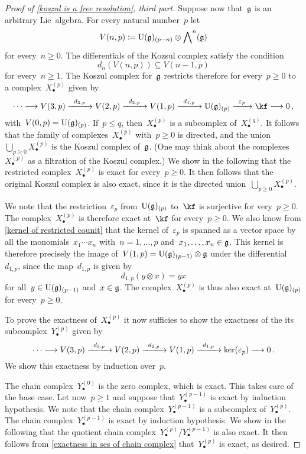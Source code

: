 \begin{proof}[Proof of \cref{koszul is a free resolution}, third part]
	Suppose now that~$\mathfrak{g}$ is an arbitrary Lie~algebra.
	For every natural number~$p$ let
	\[
		V(n,p)
		\coloneqq
		\operatorname{U}(\mathfrak{g})_{(p-n)} \otimes \operatorname{\bigwedge}^n(\mathfrak{g})
	\]
	for every~$n \geq 0$.
	The differentials of the Kozsul complex satisfy the condition
	\[
		d_n( V(n,p) )
		\subseteq
		V(n-1,p)
	\]
	for every~$n \geq 1$.
	The Koszul complex for~$\mathfrak{g}$ restricts therefore for every~$p \geq 0$ to a complex~$X^{(p)}_\bullet$ given by
	\[
		\dotsb
		\to
		V(3,p)
		\xto{d_{3,p}}
		V(2,p)
		\xto{d_{2,p}}
		V(1,p)
		\xto{d_{1,p}}
		\Univ(\glie)_{(p)}
		\xto{\varepsilon_p}
		\kf
		\to
		0 \,,
	\]
	with~$V(0,p) = \operatorname{U}(\mathfrak{g})_{(p)}$.
	If~$p \leq q$, then~$X^{(p)}_\bullet$ is a subcomplex of~$X^{(q)}_\bullet$.
	It follows that the family of complexes~$X^{(p)}_\bullet$ with~$p \geq 0$ is directed, and the union~$\bigcup_{p \geq 0} X^{(p)}_\bullet$ is the Koszul complex of~$\mathfrak{g}$.
	(One may think about the complexes~$X^{(p)}_\bullet$ as a filtration of the Koszul complex.)
	We show in the following that the restricted complex~$X^{(p)}_\bullet$ is exact for every~$p \geq 0$.
	It then follows that the original Koszul complex is also exact, since it is the directed union~$\bigcup_{p \geq 0} X^{(p)}_\bullet$.

	We note that the restriction~$\varepsilon_p$ from~$\operatorname{U}(\mathfrak{g})_{(p)}$ to~$\kf$ is surjective for very~$p \geq 0$.
	The complex~$X^{(p)}_\bullet$ is therefore exact at~$\kf$ for every~$p \geq 0$.
	We also know from \cref{kernel of restricted counit} that the kernel of~$\varepsilon_p$ is spanned as a vector space by all the monomials~$x_1 \dotsm x_n$ with~$n = 1, \dotsc, p$ and~$x_1, \dotsc, x_n \in \mathfrak{g}$.
	This kernel is therefore precisely the image of~$V(1,p) = \operatorname{U}(\mathfrak{g})_{(p-1)} \otimes \mathfrak{g}$ under the differential~$d_{1,p}$, since the map~$d_{1,p}$ is given by
	\[
		d_{1,p}( y \otimes x )
		=
		y x
	\]
	for all~$y \in \operatorname{U}(\mathfrak{g})_{(p-1)}$ and~$x \in \mathfrak{g}$.
	The complex~$X^{(p)}_\bullet$ is thus also exact at~$\operatorname{U}(\mathfrak{g})_{(p)}$ for every~$p \geq 0$.

	To prove the exactness of~$X^{(p)}_\bullet$ it now sufficies to show the exactness of the its subcomplex~$Y^{(p)}_\bullet$ given by
	\[
		\dotsb
		\to
		V(3,p)
		\xto{d_{3,p}}
		V(2,p)
		\xto{d_{2,p}}
		V(1,p)
		\xto{d_{1,p}}
		\ker( \varepsilon_p )
		\to
		0 \,.
	\]
	We show this exactness by induction over~$p$.

	The chain complex~$Y^{(0)}_\bullet$ is the zero complex, which is exact.
	This takes care of the base case.
	Let now~$p \geq 1$ and suppose that~$Y^{(p-1)}_\bullet$ is exact by induction hypothesis.
	We note that the chain complex~$Y^{(p-1)}_\bullet$ is a subcomplex of~$Y^{(p)}_\bullet$.
	The chain complex~$Y^{(p-1)}_\bullet$ is exact by induction hypothesis.
	We show in the following that the quotient chain complex~$Y^{(p)}_\bullet / Y^{(p-1)}_\bullet$ is also exact.
	It then follows from \cref{exactness in ses of chain complex} that~$Y^{(p)}_\bullet$ is exact, as desired.


\end{proof}
